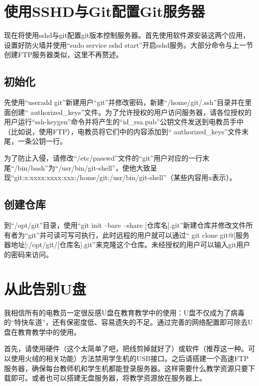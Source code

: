 \section{使用SSHD与Git配置Git服务器}
现在将使用sshd与git配置git版本控制服务器。首先使用软件源安装这两个应用，设置好防火墙并使用“sudo service sshd start”开启sshd服务。大部分命令与上一节创建FTP服务器类似，这里不再赘述。
\subsection{初始化}
先使用“useradd git”新建用户“git”并修改密码，新建“/home/git/.ssh”目录并在里面创建“ authorized\_keys”文件。为了允许授权的用户访问服务器，请各位授权的用户运行“ssh-keygen”命令并将产生的“id\_rsa.pub”公钥文件发送到电教员手中（比如说，使用FTP），电教员将它们中的内容添加到“ authorized\_keys”文件末尾，一条公钥一行。\par
为了防止入侵，请修改“/etc/passwd”文件的“git”用户对应的一行末尾“/bin/bash”为“/usr/bin/git-shell”，使他大致呈现“git:x:xxxx:xxxx:xxx:/home/git:/usr/bin/git-shell”（某些内容用x表示）。
\subsection{创建仓库}
到“/opt/git”目录，使用“git init --bare --share [仓库名].git”新建仓库并修改文件所有者为“git”并可读可写可执行，此时远程的用户就可以通过“ git clone git@[服务器地址]:/opt/git/[仓库名].git”来克隆这个仓库。未经授权的用户可以输入git用户的密码来访问。
\section{从此告别U盘}
我相信所有的电教员一定很反感U盘在教育教学中的使用：U盘不仅成为了病毒的“特快车道”，还有保密度低、容易遗失的不足。通过完善的网络配置即可除去U盘在教育教学中的使用。\par
首先，请使用硬件（这个太简单了吧，把线剪掉就好了）或软件（推荐这一种。可以使用火绒的相关功能）方法禁用学生机的USB接口。之后请搭建一个高速FTP服务器，确保每台教师机和学生机都能登录服务器。这样需要什么教学资源只要下载即可。或者也可以搭建无盘服务器，将教学资源放在服务器上。
